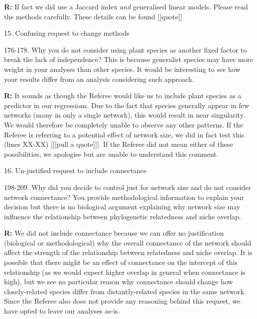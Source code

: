 \documentclass[12pt]{letter}
\newenvironment{refquote}{\bigskip \begin{it}}{\end{it}\smallskip}
\begin{document}
		\textbf{R:} If fact we did use a Jaccard index \emph{and} generalised linear models. Please read the methods carefully. These details can be found [[quote]]


	15. Confusing request to change methods

		\begin{refquote}
			176-178. Why you do not consider using plant species as another fixed factor to break the lack of independence? This is because generalist species may have more weight in your analyses than other species. It would be interesting to see how your results differ from an analysis considering such approach.
		\end{refquote}

		\textbf{R:} It sounds as though the Referee would like us to include plant species as a predictor in our regressions. Due to the fact that species generally appear in few networks (many in only a single network), this would result in near singularity. We would therefore be completely unable to observe any other patterns. If the Referee is referring to a potential effect of network size, we did in fact test this (lines XX-XX) [[[pull a quote]]]. If the Referee did not mean either of these possibilities, we apologise but are unable to understand this comment.


	16. Un-justified request to include connectance

		\begin{refquote}
			198-209. Why did you decide to control just for network size and do not consider network connectance? You provide methodological information to explain your decision but there is no biological argument explaining why network size may influence the relationship between phylogenetic relatedness and niche overlap.
		\end{refquote}

		\textbf{R:} We did not include connectance because we can offer no justification (biological or methodological) why the overall connectance of the network should affect the strength of the relationship between relatedness and niche overlap. It is possible that there might be an effect of connectance on the intercept of this relationship (as we would expect higher overlap in general when connectance is high), but we see no particular reason why connectance should change how closely-related species differ from distantly-related species in the same network. Since the Referee also does not provide any reasoning behind this request, we have opted to leave our analyses as-is.
\end{document}
